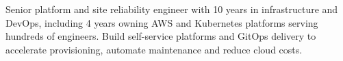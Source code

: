 Senior platform and site reliability engineer with 10 years in infrastructure
and DevOps, including 4 years owning AWS and Kubernetes platforms serving
hundreds of engineers. Build self-service platforms and GitOps delivery to accelerate
provisioning, automate maintenance and reduce cloud costs.
